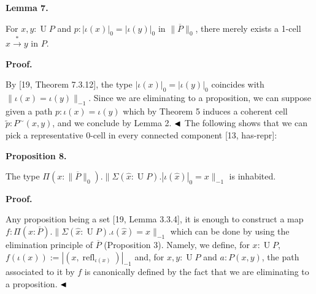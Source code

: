 \documentclass[10pt,a4paper]{amsart}
\begin{document}
\par\medskip\noindent\textbf{Lemma 7.}\par
 
 
For $x,y:\operatorname{U}P$ and $p:|\iota(x)|_{0}=|\iota(y)|_{0}$ in $\|\overline{P}\|_{0}$, there merely exists a 1-cell $x\overset{*}{\to}y$ in $P$.\par
 
 
 
 
 
\par\medskip\noindent\textbf{Proof.}\par
 
 
By [19, Theorem 7.3.12], the type $|\iota(x)|_{0}=|\iota(y)|_{0}$ coincides with $\|\iota(x)=\iota(y)\|_{-1}$. Since we are eliminating to a proposition, we can suppose given a path $p:\iota(x)=\iota(y)$ which by Theorem 5 induces a coherent cell $\tilde{p}:P^{\sim}(x,y)$, and we conclude by Lemma 2. $\hfill\blacktriangleleft$ The following shows that we can pick a representative 0-cell in every connected component [13, has-repr]:\par
 
 
 
\par\medskip\noindent\textbf{Proposition 8.}\par
 
 
The type $\Pi(x:\|\overline{P}\|_{0}).\|\Sigma(\hat{x}:\operatorname{U}P).|\iota(\hat{x})|_{0}=x\|_{-1}$ is inhabited.\par
 
 
 
 
 
\par\medskip\noindent\textbf{Proof.}\par
 
 
Any proposition being a set [19, Lemma 3.3.4], it is enough to construct a map $f:\Pi(x:\overline{P}).\|\Sigma(\hat{x}:\operatorname{U}P).\iota(\hat{x})=x\|_{-1}$ which can be done by using the elimination principle of $\overline{P}$ (Proposition 3). Namely, we define, for $x:\operatorname{U}P$, $f(\iota(x)):=|(x,\operatorname{refl}_{\iota(x)})|_{-1}$ and, for $x,y:\operatorname{U}P$ and $a:P(x,y)$, the path associated to it by $f$ is canonically defined by the fact that we are eliminating to a proposition. $\hfill\blacktriangleleft$\par
 
\end{document}
